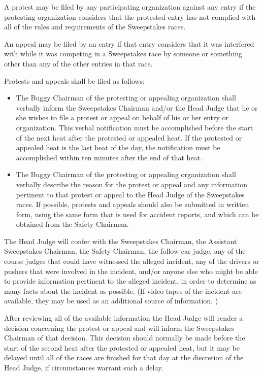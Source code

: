	A protest may be filed by any participating organization against any entry if
	the protesting organization considers that the protested entry has not complied
	with all of the rules and requirements of the Sweepstakes races.

	An appeal may be filed by an entry if that entry considers that it was
	interfered with while it was competing in a Sweepstakes race by someone or
	something other than any of the other entries in that race.

	Protests and appeals shall be filed as follows:

	\begin{itemize}

		\item
		The Buggy Chairman of the protesting or appealing organization shall verbally
		inform the Sweepstakes Chairman and/or the Head Judge that he or she wishes to
		file a protest or appeal on behalf of his or her entry or organization. This
		verbal notification must be accomplished before the start of the next heat
		after the protested or appealed heat. If the protested or appealed heat is the
		last heat of the day, the notification must be accomplished within ten minutes
		after the end of that heat.

		\item
		The Buggy Chairman of the protesting or appealing organization shall verbally
		describe the reason for the protest or appeal and any information pertinent to
		that protest or appeal to the Head Judge of the Sweepstakes races. If possible,
		protests and appeals should also be submitted in written form, using the same
		form that is used for accident reports, and which can be obtained from the
		Safety Chairman.

	\end{itemize}

	The Head Judge will confer with the Sweepstakes Chairman, the Assistant
	Sweepstakes Chairman, the Safety Chairman, the follow car judge, any of the
	course judges that could have witnessed the alleged incident, any of the
	drivers or pushers that were involved in the incident, and/or anyone else who
	might be able to provide information pertinent to the alleged incident, in
	order to determine as many facts about the incident as possible. (If video
	tapes of the incident are available, they may be used as an additional source
	of information. )

	After reviewing all of the available information the Head Judge will render a
	decision concerning the protest or appeal and will inform the Sweepstakes
	Chairman of that decision. This decision should normally be made before the
	start of the second heat after the protested or appealed heat, but it may be
	delayed until all of the races are finished for that day at the discretion of
	the Head Judge, if circumstances warrant such a delay.

